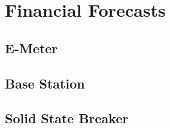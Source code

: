 \section{Financial Forecasts}
\subsection{E-Meter}




\subsection{Base Station}





\subsection{Solid State Breaker}




\newpage